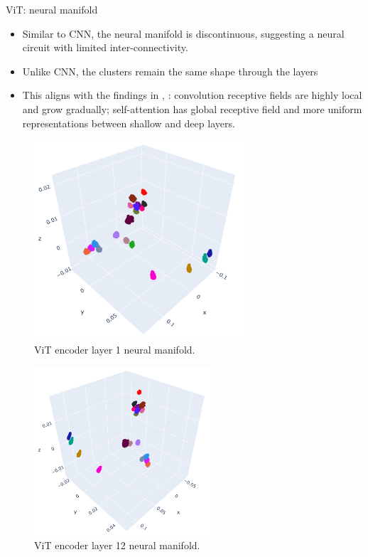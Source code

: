 \documentclass[xcolor={dvipsnames,svgnames}]{beamer}
\begin{document}
\begin{frame}{ViT: neural manifold}
\begin{itemize}
    \item Similar to CNN, the neural manifold is discontinuous, suggesting a neural circuit with limited inter-connectivity.
    \item Unlike CNN, the clusters remain the same shape through the layers
    \item This aligns with the findings in \cite{coatnet_2021}, \cite{raghu_vision_2021}: convolution receptive fields are highly local and grow gradually; self-attention has global receptive field and more uniform representations between shallow and deep layers.
\end{itemize}

    \begin{minipage}[t]{.45\linewidth}  
    \begin{figure}
            \includegraphics[width=0.7\textwidth]{figures/embeddings/vit-2d-layer1.png}
             \caption{ViT encoder layer 1 neural manifold.}
        \end{figure} 
    \end{minipage}
      \begin{minipage}[t]{.45\linewidth}   
      \begin{figure}         \includegraphics[width=0.6\textwidth]{figures/embeddings/vit-2d-layer12.png}
       \caption{ViT encoder layer 12 neural manifold.}
            \end{figure} 
    \end{minipage}
\end{frame}
\end{document}
